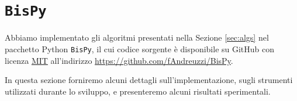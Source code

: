 \section{\texttt{BisPy}}
\label{sec:bispy}
Abbiamo implementato gli algoritmi presentati nella Sezione \ref{sec:algs} nel pacchetto Python \texttt{BisPy}, il cui codice sorgente è disponibile su GitHub con licenza \href{https://github.com/fAndreuzzi/BisPy/blob/master/LICENSE}{MIT} all'indirizzo \href{https://github.com/fAndreuzzi/BisPy}{https://github.com/fAndreuzzi/BisPy}.

In questa sezione forniremo alcuni dettagli sull'implementazione, sugli strumenti utilizzati durante lo sviluppo, e presenteremo alcuni risultati sperimentali.




